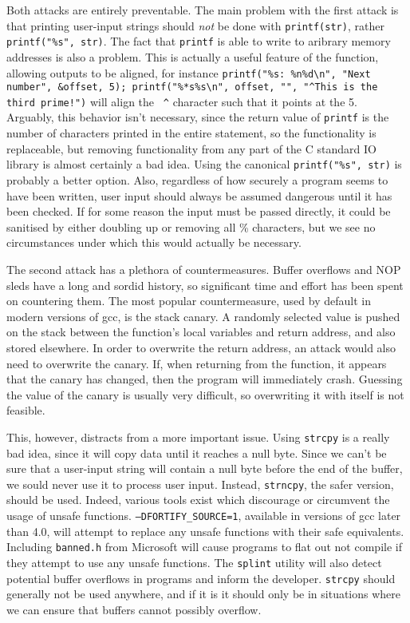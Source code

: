 Both attacks are entirely preventable. The main problem with the first attack is that printing user-input strings should
\emph{not} be done with {\tt printf(str)}, rather {\tt printf("\%s", str)}. The fact that {\tt printf} is able to write
to aribrary memory addresses is also a problem. This is actually a useful feature of the function, allowing outputs to
be aligned, for instance {\tt printf("\%s: \%n\%d\textbackslash n", "Next number", \&offset, 5);
printf("\%*s\%s\textbackslash n", offset, "", "\textasciicircum This is the third prime!")} will align the {\tt
\textasciicircum} character such that it points at the 5. Arguably, this behavior isn't necessary, since the return
value of {\tt printf} is the number of characters printed in the entire statement, so the functionality is replaceable,
but removing functionality from any part of the C standard IO library is almost certainly a bad idea. Using the
canonical {\tt printf("\%s", str)} is probably a better option. Also, regardless of how securely a program seems to have
been written, user input should always be assumed dangerous until it has been checked. If for some reason the input must
be passed directly, it could be sanitised by either doubling up or removing all \% characters, but we see no
circumstances under which this would actually be necessary.

The second attack has a plethora of countermeasures. Buffer overflows and NOP sleds have a long and sordid history, so
significant time and effort has been spent on countering them. The most popular countermeasure, used by default in
modern versions of gcc, is the stack canary. A randomly selected value is pushed on the stack between the function's
local variables and return address, and also stored elsewhere. In order to overwrite the return address, an attack would
also need to overwrite the canary. If, when returning from the function, it appears that the canary has changed, then
the program will immediately crash. Guessing the value of the canary is usually very difficult, so overwriting it with
itself is not feasible.

This, however, distracts from a more important issue. Using {\tt strcpy} is a really bad idea, since it will copy data
until it reaches a null byte. Since we can't be sure that a user-input string will contain a null byte before the end of
the buffer, we sould never use it to process user input. Instead, {\tt strncpy}, the safer version, should be used.
Indeed, various tools exist which discourage or circumvent the usage of unsafe functions.
{\tt --DFORTIFY\_SOURCE=1}, available in versions of gcc later than 4.0, will attempt to replace any unsafe functions
with their safe equivalents. Including {\tt banned.h} from Microsoft
will cause programs to flat out not compile if they attempt to use any unsafe functions. The {\tt splint} utility will
also detect potential buffer overflows in programs and inform the developer. {\tt strcpy} should generally not be used
anywhere, and if it is it should only be in situations where we can ensure that buffers cannot possibly overflow.

